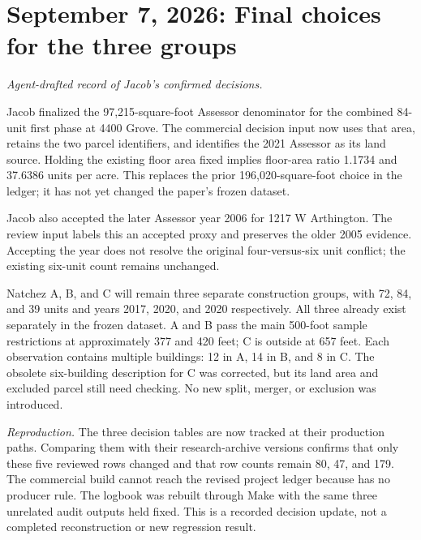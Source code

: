 \section*{September 7, 2026: Final choices for the three groups}
\textit{Agent-drafted record of Jacob's confirmed decisions.}

Jacob finalized the 97,215-square-foot Assessor denominator for the combined
84-unit first phase at 4400 Grove. The commercial decision input now uses that
area, retains the two parcel identifiers, and identifies the 2021 Assessor as
its land source. Holding the existing floor area fixed implies floor-area ratio
1.1734 and 37.6386 units per acre. This replaces the prior 196,020-square-foot
choice in the ledger; it has not yet changed the paper's frozen dataset.

Jacob also accepted the later Assessor year 2006 for 1217 W Arthington. The review
input labels this an accepted proxy and preserves the older 2005 evidence.
Accepting the year does not resolve the original four-versus-six unit conflict;
the existing six-unit count remains unchanged.

Natchez A, B, and C will remain three separate construction groups, with 72,
84, and 39 units and years 2017, 2020, and 2020 respectively. All three already
exist separately in the frozen dataset. A and B pass the main 500-foot sample
restrictions at approximately 377 and 420 feet; C is outside at 657 feet.
Each observation contains multiple buildings: 12 in A, 14 in B, and 8 in C.
The obsolete six-building description for C was corrected, but its land area
and excluded parcel still need checking. No new split, merger, or exclusion
was introduced.

\small
\textit{Reproduction.} The three decision tables are now tracked at their
production paths. Comparing them with their research-archive versions confirms
that only these five reviewed rows changed and that row counts remain 80, 47,
and 179. The commercial build cannot reach the revised project ledger because
 has no producer rule. The
logbook was rebuilt through Make with the same three unrelated audit outputs
held fixed. This is a recorded decision update, not a completed reconstruction
or new regression result.
\normalsize
